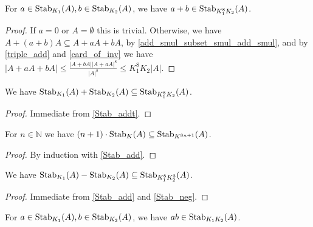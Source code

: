 \begin{lemma}
    \label{Stab_addt}
    \leanok
    For $a \in \operatorname{\operatorname{Stab}}_{K_1}(A), b \in \operatorname{\operatorname{Stab}}_{K_2}(A)$, we have $a+b \in \operatorname{\operatorname{Stab}}_{K_1^8 K_2}(A)$.
\end{lemma}

\begin{proof}
    \leanok
    If $a = 0$ or $A = \emptyset$ this is trivial. Otherwise, we have $A + (a+b) A \subseteq A + a A + b A$, by \ref{add_smul_subset_smul_add_smul},
    and by \ref{triple_add} and \ref{card_of_inv} we have $|A + a A + b A| \leq \frac{|A + bA| |A + aA|^8} {|A|^8} \leq K_1^8 K_2 |A|$.
\end{proof}

\begin{lemma}
    \label{Stab_add}
    \leanok
    We have $\operatorname{\operatorname{Stab}}_{K_1}(A) + \operatorname{\operatorname{Stab}}_{K_2}(A) \subseteq \operatorname{\operatorname{Stab}}_{K_1^8 K_2}(A)$.
\end{lemma}

\begin{proof}
    \leanok
    Immediate from \ref{Stab_addt}.
\end{proof}

\begin{lemma}
    \label{Stab_nsmul}
    \leanok
    For $n \in \mathbb{N}$ we have $(n+1) \cdot \operatorname{\operatorname{Stab}}_{K}(A) \subseteq \operatorname{\operatorname{Stab}}_{K^{8n + 1}}(A)$.
\end{lemma}

\begin{proof}
    \leanok
    By induction with \ref{Stab_add}.
\end{proof}

\begin{lemma}
    \label{Stab_sub}
    \leanok
    We have $\operatorname{\operatorname{Stab}}_{K_1}(A) - \operatorname{\operatorname{Stab}}_{K_2}(A) \subseteq \operatorname{\operatorname{Stab}}_{K_1^8 K_2^3}(A)$.
\end{lemma}

\begin{proof}
    \leanok
    Immediate from \ref{Stab_add} and \ref{Stab_neg}.
\end{proof}

\begin{lemma}
    \label{Stab_mult}
    \leanok
    For $a \in \operatorname{\operatorname{Stab}}_{K_1}(A), b \in \operatorname{\operatorname{Stab}}_{K_2}(A)$, we have $ab \in \operatorname{\operatorname{Stab}}_{K_1 K_2}(A)$.
\end{lemma}

